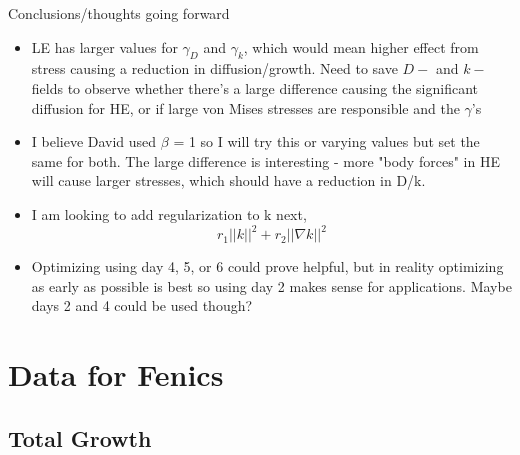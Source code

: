 \documentclass{beamer}
\begin{document}
\begin{frame}{Conclusions/thoughts going forward}
	\begin{minipage}[T][.7\textheight][t]{\textwidth}
		\begin{itemize}
			\item LE has larger values for $\gamma_D$ and $\gamma_k$, which would mean higher effect from stress causing a reduction in diffusion/growth. Need to save $D-$ and $k-$fields to observe whether there's a large difference causing the significant diffusion for HE, or if large von Mises stresses are responsible and the $\gamma$'s 
			\item I believe David used $\beta$ = 1 so I will try this or varying values but set the same for both. The large difference is interesting - more "body forces" in HE will cause larger stresses, which should have a reduction in D/k.
			\item I am looking to add regularization to k next, 
			\[ r_1||k||^2 + r_2||\nabla k||^2\]
			\item Optimizing using day 4, 5, or 6 could prove helpful, but in reality optimizing as early as possible is best so using day 2 makes sense for applications. Maybe days 2 and 4 could be used though?
		\end{itemize}
	\end{minipage}
\end{frame}



\section{Data for Fenics}
\subsection{Total Growth}
\end{document}
